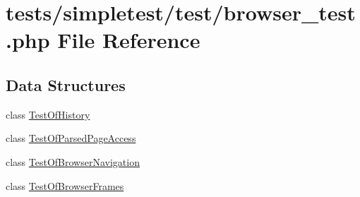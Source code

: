 \hypertarget{browser__test_8php}{\section{tests/simpletest/test/browser\-\_\-test.php File Reference}
\label{browser__test_8php}
}
\subsection*{Data Structures}
\begin{DoxyCompactItemize}
\item 
class \hyperlink{class_test_of_history}{Test\-Of\-History}
\item 
class \hyperlink{class_test_of_parsed_page_access}{Test\-Of\-Parsed\-Page\-Access}
\item 
class \hyperlink{class_test_of_browser_navigation}{Test\-Of\-Browser\-Navigation}
\item 
class \hyperlink{class_test_of_browser_frames}{Test\-Of\-Browser\-Frames}
\end{DoxyCompactItemize}
